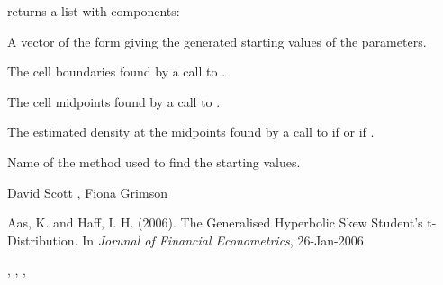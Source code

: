 \begin{Value}
 returns a list with components:
\begin{ldescription}
\item[\code{paramStart}] A vector of the form 
giving the generated starting values of the parameters.
\item[\code{breaks}] The cell boundaries found by a call to .
\item[\code{midpoints}] The cell midpoints found by a call to .
\item[\code{empDens}] The estimated density at the midpoints found by a call
to  if  or
 if .
\item[\code{svName}] Name of the method used to find the starting values.
\end{ldescription}
\end{Value}
\begin{Author}\relax
David Scott , Fiona Grimson
\end{Author}
\begin{References}\relax
Aas, K. and Haff, I. H. (2006).
The Generalised Hyperbolic Skew Student's t-Distribution.
In \emph{Jorunal of Financial Econometrics}, 26-Jan-2006
\end{References}
\begin{SeeAlso}\relax
{}, , ,
\end{SeeAlso}

